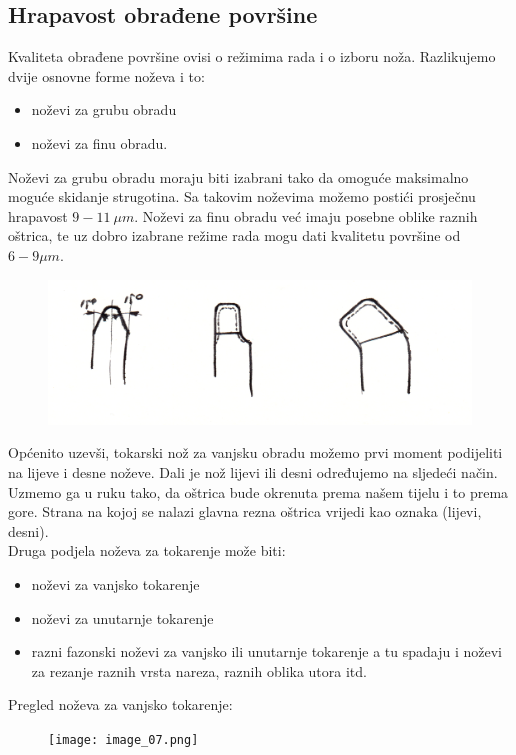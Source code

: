 \documentclass[a4paper,12pt]{article}
\numberwithin{figure}{section}
\begin{document}
\subsection{Hrapavost obrađene površine}
Kvaliteta obrađene površine ovisi o režimima rada i o izboru noža. Razlikujemo dvije osnovne forme noževa i to:
\begin{itemize}
\item noževi za grubu obradu
\item noževi za finu obradu.
\end{itemize}
Noževi za grubu obradu moraju biti izabrani tako da omoguće maksimalno moguće skidanje strugotina. Sa takovim noževima možemo postići prosječnu hrapavost  $9 - 11\:\mu m$. Noževi za finu obradu već imaju posebne oblike raznih oštrica, te uz dobro izabrane režime rada mogu dati kvalitetu površine od $6-9 \mu m$.
\begin{figure}[!h]
\includegraphics[width=\textwidth]{image_06-2.png}
\end{figure}
\FloatBarrier
Općenito uzevši, tokarski nož za vanjsku obradu možemo prvi moment podijeliti na lijeve i desne noževe. Dali je nož lijevi ili desni određujemo na sljedeći način. Uzmemo ga u ruku tako, da oštrica bude okrenuta prema našem tijelu i to prema gore. Strana na kojoj se nalazi glavna rezna oštrica vrijedi kao oznaka (lijevi, desni).\\
Druga podjela noževa za tokarenje može biti:
\begin{itemize}
\item noževi za vanjsko tokarenje
\item noževi za unutarnje tokarenje
\item razni fazonski noževi za vanjsko ili unutarnje tokarenje a tu spadaju i noževi za rezanje raznih vrsta nareza, raznih oblika utora itd.
\end{itemize}
Pregled noževa za vanjsko tokarenje:
\begin{figure}[!h]
\texttt{[image: image\_07.png]}
\end{figure}
\FloatBarrier
\end{document}
